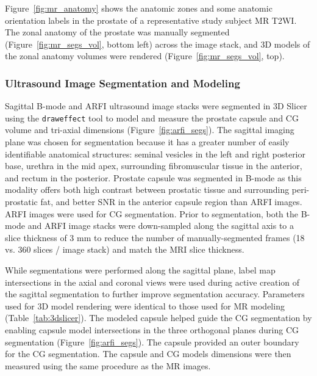 

Figure~\ref{fig:mr_anatomy} shows the anatomic zones and some anatomic
orientation labels in the prostate of a representative study subject MR T2WI.
The zonal anatomy of the prostate was manually segmented
(Figure~\ref{fig:mr_segs_vol}, bottom left) across the image stack, and 3D
models of the zonal anatomy volumes were rendered
(Figure~\ref{fig:mr_segs_vol}, top).



\subsubsection{Ultrasound Image Segmentation and Modeling}
Sagittal B-mode and ARFI ultrasound image stacks were segmented in 3D Slicer
using the \verb+draweffect+ tool to model and measure the prostate capsule and
CG volume and tri-axial dimensions (Figure~\ref{fig:arfi_segs}).  The sagittal
imaging plane was chosen for segmentation because it has a greater number of
easily identifiable anatomical structures:  seminal vesicles in the left and
right posterior base, urethra in the mid apex, surrounding fibromuscular tissue
in the anterior, and rectum in the posterior. Prostate capsule was segmented in
B-mode as this modality offers both high contrast between prostatic tissue and
surrounding peri-prostatic fat, and better SNR in the anterior capsule region
than ARFI images. ARFI images were used for CG segmentation.  Prior to
segmentation, both the B-mode and ARFI image stacks were down-sampled along the
sagittal axis to a slice thickness of 3 mm to reduce the number of
manually-segmented frames (18 vs. 360 slices / image stack) and match the MRI
slice thickness. 

While segmentations were performed along the sagittal plane, label map
intersections in the axial and coronal views were used during active creation
of the sagittal segmentation to further improve segmentation accuracy.
Parameters used for 3D model rendering were identical to those used for MR
modeling (Table~\ref{tab:3dslicer}).  The modeled capsule helped guide the CG
segmentation by enabling capsule model intersections in the three orthogonal
planes during CG segmentation (Figure~\ref{fig:arfi_segs}). The capsule
provided an outer boundary for the CG segmentation. The capsule and CG models
dimensions were then measured using the same procedure as the MR images.



